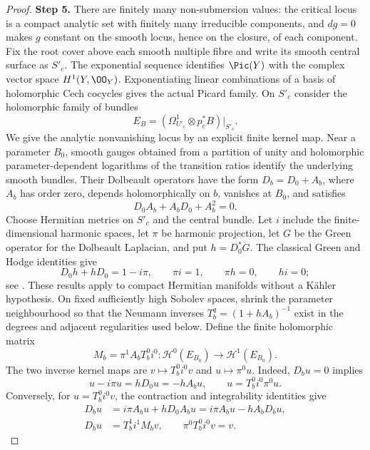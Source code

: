 \begin{proof}
\noindent\textbf{Step 5.} There are finitely many non-submersion values: the critical locus is a compact analytic set with finitely many irreducible components, and $dg=0$ makes $g$ constant on the smooth locus, hence on the closure, of each component. Fix the root cover above each smooth multiple fibre and write its smooth central surface as $S'_c$. The exponential sequence identifies $\Pic(Y)$ with the complex vector space $H^1(Y,\OO_Y)$. Exponentiating linear combinations of a basis of holomorphic Cech cocycles gives the actual Picard family. On $S'_c$ consider the holomorphic family of bundles
\[
 E_B=(\Omega^1_{U'_c}\otimes p_c^*B)|_{S'_c}.
\]
We give the analytic nonvanishing locus by an explicit finite kernel map. Near a parameter $B_0$, smooth gauges obtained from a partition of unity and holomorphic parameter-dependent logarithms of the transition ratios identify the underlying smooth bundles. Their Dolbeault operators have the form $D_b=D_0+A_b$, where $A_b$ has order zero, depends holomorphically on $b$, vanishes at $B_0$, and satisfies
\[
 D_0A_b+A_bD_0+A_b^2=0.
\]
Choose Hermitian metrics on $S'_c$ and the central bundle. Let $i$ include the finite-dimensional harmonic spaces, let $\pi$ be harmonic projection, let $G$ be the Green operator for the Dolbeault Laplacian, and put $h=D_0^*G$. The classical Green and Hodge identities give
\[
 D_0h+hD_0=1-i\pi,\qquad \pi i=1,
 \qquad \pi h=0,\qquad hi=0;
\]
see \cite[Part~I, Theorem~3.15, author-PDF body p.~15, and Theorems~7.1--7.2, body p.~32]{DemaillyHodgeAuthor2002}. These results apply to compact Hermitian manifolds without a K\"ahler hypothesis. On fixed sufficiently high Sobolev spaces, shrink the parameter neighbourhood so that the Neumann inverses $T_b^q=(1+hA_b)^{-1}$ exist in the degrees and adjacent regularities used below. Define the finite holomorphic matrix
\[
 M_b=\pi^1 A_b T_b^0 i^0:
 \mathcal H^0(E_{B_0})\longrightarrow\mathcal H^1(E_{B_0}).
\]
The two inverse kernel maps are $v\mapsto T_b^0i^0v$ and $u\mapsto\pi^0u$. Indeed, $D_bu=0$ implies
\[
 u-i\pi u=hD_0u=-hA_bu,
 \qquad u=T_b^0i^0\pi^0u.
\]
Conversely, for $u=T_b^0i^0v$, the contraction and integrability identities give
\[
 \begin{aligned}
 D_bu&=i\pi A_bu+hD_0A_bu
       =i\pi A_bu-hA_bD_bu,\\
 D_bu&=T_b^1i^1M_bv,\qquad
 \pi^0T_b^0i^0v=v.
 \end{aligned}
\]

\end{proof}

